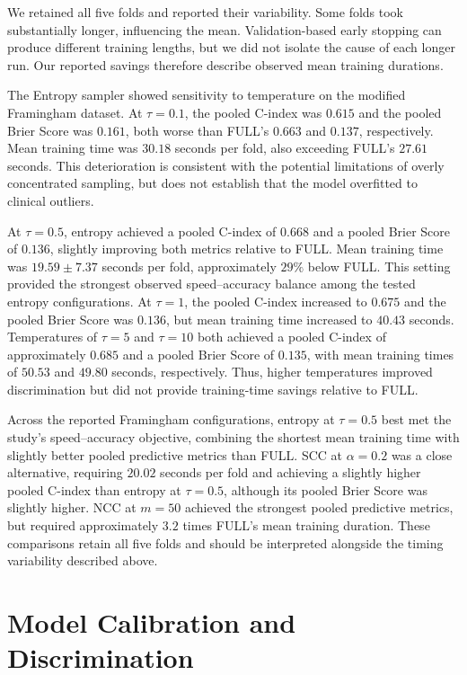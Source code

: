 \documentclass[a4paper,twoside,12pt]{report}
\begin{document}
We retained all five folds and reported their variability. Some folds took substantially longer, influencing the mean. Validation-based early stopping can produce different training lengths, but we did not isolate the cause of each longer run. Our reported savings therefore describe observed mean training durations.


The Entropy sampler showed sensitivity to temperature on the modified Framingham dataset. At $\tau=0.1$, the pooled C-index was $0.615$ and the pooled Brier Score was $0.161$, both worse than FULL's $0.663$ and $0.137$, respectively. Mean training time was $30.18$ seconds per fold, also exceeding FULL's $27.61$ seconds. This deterioration is consistent with the potential limitations of overly concentrated sampling, but does not establish that the model overfitted to clinical outliers.

At $\tau=0.5$, entropy achieved a pooled C-index of $0.668$ and a pooled Brier Score of $0.136$, slightly improving both metrics relative to FULL. Mean training time was $19.59 \pm 7.37$ seconds per fold, approximately $29\%$ below FULL. This setting provided the strongest observed speed--accuracy balance among the tested entropy configurations. At $\tau=1$, the pooled C-index increased to $0.675$ and the pooled Brier Score was $0.136$, but mean training time increased to $40.43$ seconds. Temperatures of $\tau=5$ and $\tau=10$ both achieved a pooled C-index of approximately $0.685$ and a pooled Brier Score of $0.135$, with mean training times of $50.53$ and $49.80$ seconds, respectively. Thus, higher temperatures improved discrimination but did not provide training-time savings relative to FULL.

Across the reported Framingham configurations, entropy at $\tau=0.5$ best met the study's speed--accuracy objective, combining the shortest mean training time with slightly better pooled predictive metrics than FULL. SCC at $\alpha=0.2$ was a close alternative, requiring $20.02$ seconds per fold and achieving a slightly higher pooled C-index than entropy at $\tau=0.5$, although its pooled Brier Score was slightly higher. NCC at $m=50$ achieved the strongest pooled predictive metrics, but required approximately $3.2$ times FULL's mean training duration. These comparisons retain all five folds and should be interpreted alongside the timing variability described above.

\section{Model Calibration and Discrimination}
\end{document}
